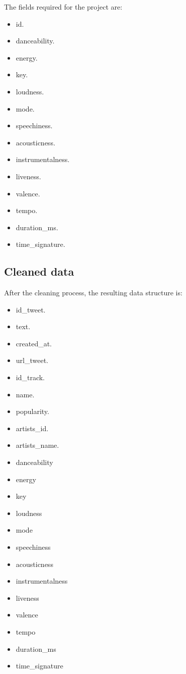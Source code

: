 \nonzeroparskip The fields required for the project are:
\begin{itemize}
	\item id.
	\item danceability.
	\item energy.
	\item key.
	\item loudness.
	\item mode.
	\item speechiness.
	\item acousticness.
	\item instrumentalness.
	\item liveness.
	\item valence.
	\item tempo.
	\item duration\_ms.
	\item time\_signature.
\end{itemize}

\subsection{Cleaned data}
\nonzeroparskip After the cleaning process, the resulting data structure is:

\begin{itemize}
	\item id\_tweet.
	\item text.
	\item created\_at.
	\item url\_tweet.
	\item id\_track.
	\item name.
	\item popularity.
	\item artists\_id.
	\item artists\_name.
	\item danceability
	\item energy
	\item key
	\item loudness
	\item mode
	\item speechiness
	\item acousticness
	\item instrumentalness
	\item liveness
	\item valence
	\item tempo
	\item duration\_ms
	\item time\_signature
\end{itemize}


